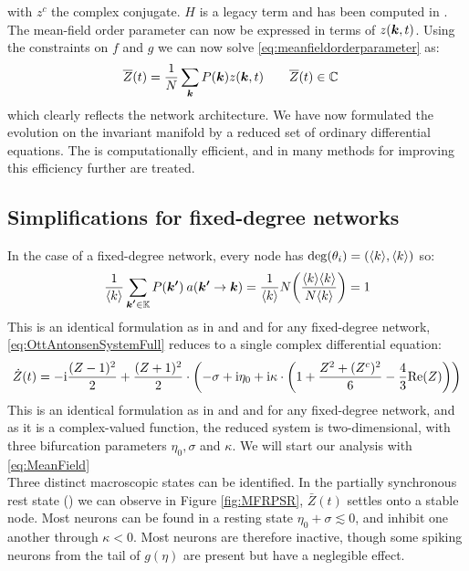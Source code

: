 with $z^c$ the complex conjugate. $H$ is a legacy term and has been computed in \cite{Martens2020}.
The mean-field order parameter can now be expressed in terms of $z({\boldsymbol{k}},t)$. Using the constraints on $f$ and $g$ we can now solve \eqref{eq:meanfieldorderparameter} as:
\begin{align}
\overline{Z}(t) &= \frac{1}{N} \sum_{{\boldsymbol{k}}} P({\boldsymbol{k}}) z({\boldsymbol{k}}, t) \qquad \overline{Z}(t) \in {\mathbb{C}} \label{eq:OttAntonsenMeanField}
\end{align}
which clearly reflects the network architecture. We have now formulated the evolution on the invariant manifold by a reduced set of ordinary differential equations. The \MFR is computationally efficient, and in \cite{OttAntonsen2017} many methods for improving this efficiency further are treated.


\subsection{Simplifications for fixed-degree networks}
In the case of a fixed-degree network, every node has $\deg (\theta_i) = ({\langle k\rangle}, {\langle k\rangle})$ so:
\begin{align*}
    \frac{1}{\kmean} \sum_{\kacc \in \K} P\left(\kacc\right) \: a\left(\kacc \rightarrow \k\right) = \frac{1}{\kmean} N \left( \frac{\kmean \kmean}{N \kmean} \right) = 1
\end{align*}
This is an identical formulation as in \cite{Luke2013} and \cite{Martens2020} and for any fixed-degree network, \eqref{eq:OttAntonsenSystemFull} reduces to a single complex differential equation:
\begin{align}
\dot{Z}(t)= -\ic \frac{(Z-1)^2}{2}+\frac{(Z+1)^2}{2} \cdot \left(-\sigma+ \ic\eta_{0}
+ \ic \kappa \cdot \left(1+\frac{Z^{2} + (Z^c)^{2} }{6} - \frac{4}{3} \Re(Z)\right)\right) \label{eq:MeanField}
\end{align}
This is an identical formulation as in \cite{Luke2013} and \cite{Martens2020} and for any fixed-degree network, and as it is a complex-valued function, the reduced system is two-dimensional, with three bifurcation parameters $\eta_0, \sigma$ and $\kappa$. We will start our analysis with \eqref{eq:MeanField}\\

Three distinct macroscopic states can be identified. In the partially synchronous rest state (\PSR) we can observe in Figure \ref{fig:MFRPSR}, $\bar{Z}(t)$ settles onto a stable node. Most neurons can be found in a resting state $\eta_0 + \sigma \lesssim 0$, and inhibit one another through $\kappa < 0$. Most neurons are therefore inactive, though some spiking neurons from the tail of $g(\eta)$ are present but have a neglegible effect. \\

